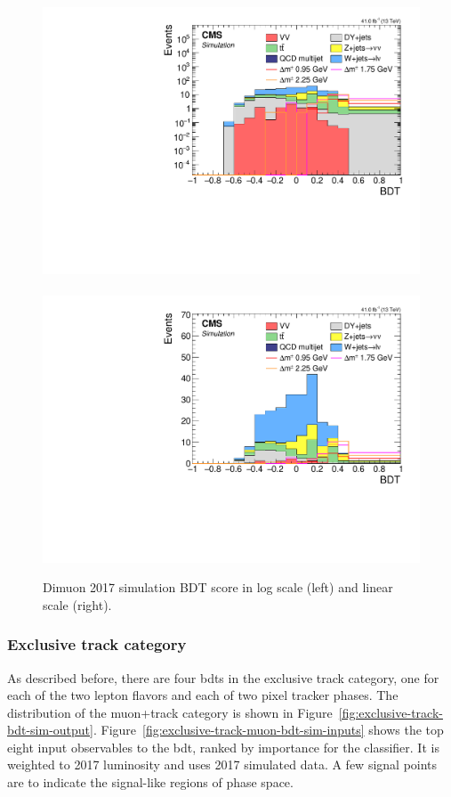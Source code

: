 \begin{figure}[!htb]
\centering
\includegraphics[width=0.48\linewidth]{plots/dilepton_muons_2017/none_custom_dilepBDTCorrJetNoMultIso10Dr0.6_log.pdf} \,
\includegraphics[width=0.48\linewidth]{plots/dilepton_muons_2017/none_custom_dilepBDTCorrJetNoMultIso10Dr0.6.pdf} \\


\caption[Dimuon simulation BDT output]{Dimuon 2017 simulation BDT score in log scale (left) and linear scale (right).}
\label{fig:dimuon-bdt-sim-output}
\end{figure}

\clearpage
\subsubsection{Exclusive track category}

As described before, there are four \glspl{bdt} in the exclusive track category, one for each of the two lepton flavors and each of two pixel tracker phases. The distribution of the muon+track category is shown in Figure~\ref{fig:exclusive-track-bdt-sim-output}. Figure~\ref{fig:exclusive-track-muon-bdt-sim-inputs} shows the top eight input observables to the \gls{bdt}, ranked by importance for the classifier. It is weighted to 2017 luminosity and uses 2017 simulated data. A few signal points are to indicate the signal-like regions of phase space. 

